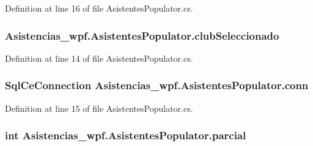 Definition at line 16 of file Asistentes\-Populator.\-cs.

\hypertarget{class_asistencias__wpf_1_1_asistentes_populator_a33a9f65088b3243c8473180e80e322d9}{
\subsubsection[{club\-Seleccionado}]{ Asistencias\-\_\-wpf.\-Asistentes\-Populator.\-club\-Seleccionado\hspace{0.3cm}{\ttfamily [private]}}}\label{class_asistencias__wpf_1_1_asistentes_populator_a33a9f65088b3243c8473180e80e322d9}


Definition at line 14 of file Asistentes\-Populator.\-cs.

\hypertarget{class_asistencias__wpf_1_1_asistentes_populator_aea7e955756112dc99c093514621320c7}{
\subsubsection[{conn}]{\setlength{\rightskip}{0pt plus 5cm}Sql\-Ce\-Connection Asistencias\-\_\-wpf.\-Asistentes\-Populator.\-conn\hspace{0.3cm}{\ttfamily [private]}}}\label{class_asistencias__wpf_1_1_asistentes_populator_aea7e955756112dc99c093514621320c7}


Definition at line 15 of file Asistentes\-Populator.\-cs.

\hypertarget{class_asistencias__wpf_1_1_asistentes_populator_abe2a5ad9e46aa901e8c8e9bbf03ef653}{
\subsubsection[{parcial}]{\setlength{\rightskip}{0pt plus 5cm}int Asistencias\-\_\-wpf.\-Asistentes\-Populator.\-parcial\hspace{0.3cm}{\ttfamily [private]}}}\label{class_asistencias__wpf_1_1_asistentes_populator_abe2a5ad9e46aa901e8c8e9bbf03ef653}


